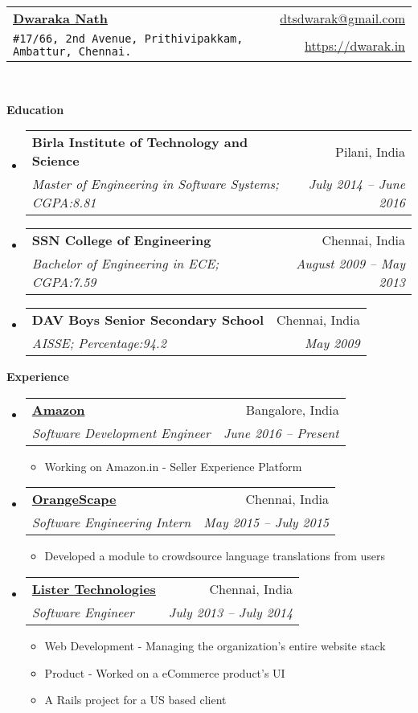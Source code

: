 \documentclass[letterpaper,11pt]{article}
\makeatletter
\newcommand{\resitem}[1]{\item #1 \vspace{-2pt}}
\newcommand{\resheading}[1]{{\large \colorbox{mygrey}{\begin{minipage}{\textwidth}{\textbf{#1 \vphantom{p\^{E}}}}\end{minipage}}}}
\newcommand{\ressubheading}[4]{
\begin{tabular*}{6.5in}{l@{\extracolsep{\fill}}r}
		\textbf{#1} & #2 \\
		\textit{#3} & \textit{#4} \\
\end{tabular*}\vspace{-6pt}}
\makeatother
\begin{document}
\newcommand{\mywebheader}{
\begin{tabular*}{7in}{l@{\extracolsep{\fill}}r}
	\textbf{\href{https://dwarak.in/}{\LARGE Dwaraka Nath}} & \href{mailto:dtsdwarak@gmail.com}{dtsdwarak@gmail.com}\\
	{\footnotesize \texttt{\#17/66, 2nd Avenue, Prithivipakkam, Ambattur, Chennai.}} & \href{https://dwarak.in}{https://dwarak.in} \\
	\end{tabular*}
\\
\vspace{0.1in}}

\mywebheader

\resheading{Education}
	\begin{itemize}
		\item
			\ressubheading{{Birla Institute of Technology and Science}}{Pilani, India}{{Master of Engineering in Software Systems};{ CGPA:8.81}}{July 2014 -- June 2016}
		\item
			\ressubheading{{SSN College of Engineering}}{Chennai, India}{{Bachelor of Engineering in ECE};{ CGPA:7.59}}{August 2009 -- May 2013}
		\item
			\ressubheading{{DAV Boys Senior Secondary School}}{Chennai, India}{{AISSE};{ Percentage:94.2}}{May 2009}			
	\end{itemize} %


\resheading{Experience}
	\begin{itemize}
	    \item 
			\ressubheading{\href{http://www.amazon.in/}{Amazon}}{Bangalore, India}
				{Software Development Engineer}{June 2016 -- Present}
				{ \footnotesize
				\begin{itemize}
					\resitem{Working on Amazon.in  - Seller Experience Platform}
				\end{itemize}
				}
		\item 
			\ressubheading{\href{http://www.orangescape.com/}{OrangeScape}}{Chennai, India}
				{Software Engineering Intern}{May 2015 -- July 2015}
				{ \footnotesize
				\begin{itemize}
					\resitem{Developed a module to crowdsource language translations from users}
				\end{itemize}
				}
		\item 
			\ressubheading{\href{http://www.listertechnologies.com/}{Lister Technologies}}{Chennai, India}
				{Software Engineer}{July 2013 -- July 2014}
				{ \footnotesize
				\begin{itemize}
					\resitem{Web Development - Managing the organization's entire website stack}
					\resitem{Product - Worked on a eCommerce product's UI}
					\resitem{A Rails project for a US based client}
				\end{itemize}
				}
	\end{itemize}  %
\end{document}
